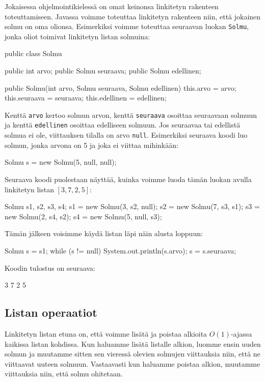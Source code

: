 Jokaisessa ohjelmointikielessä on omat keinonsa
linkitetyn rakenteen toteuttamiseen.
Javassa voimme toteuttaa linkitetyn rakenteen niin,
että jokainen solmu on oma olionsa.
Esimerkiksi voimme toteuttaa seuraavan luokan \texttt{Solmu},
jonka oliot toimivat linkitetyn listan solmuina:

\begin{code}
public class Solmu {
    public int arvo;
    public Solmu seuraava;
    public Solmu edellinen;

    public Solmu(int arvo, Solmu seuraava, Solmu edellinen) {
        this.arvo = arvo;
        this.seuraava = seuraava;
        this.edellinen = edellinen;
    }
}
\end{code}

Kenttä \texttt{arvo} kertoo solmun arvon,
kenttä \texttt{seuraava} osoittaa seuraavaan solmuun
ja kenttä \texttt{edellinen} osoittaa edelliseen solmuun.
Jos seuraavaa tai edellistä solmua ei ole,
viittauksen tilalla on arvo \texttt{null}.
Esimerkiksi seuraava koodi luo solmun,
jonka arvona on 5 ja joka ei viittaa mihinkään:

\begin{code}
Solmu s = new Solmu(5, null, null);
\end{code}

Seuraava koodi puolestaan näyttää, kuinka voimme luoda
tämän luokan avulla linkitetyn listan $[3,7,2,5]$:

\begin{code}
Solmu s1, s2, s3, s4;
s1 = new Solmu(3, s2, null);
s2 = new Solmu(7, s3, s1);
s3 = new Solmu(2, s4, s2);
s4 = new Solmu(5, null, s3);
\end{code}

Tämän jälkeen voisimme käydä listan läpi näin alusta loppuun:

\begin{code}
Solmu s = s1;
while (s != null) {
    System.out.println(s.arvo);
    s = s.seuraava;
}
\end{code}

Koodin tulostus on seuraava:

\begin{code}
3
7
2
5
\end{code}

\subsection{Listan operaatiot}

Linkitetyn listan etuna on,
että voimme lisätä ja poistaa
alkioita $O(1)$-ajassa kaikissa listan kohdissa.
Kun haluamme lisätä listalle alkion,
luomme ensin uuden solmun ja muutamme sitten
sen vieressä olevien solmujen viittauksia niin,
että ne viittaavat uuteen solmuun.
Vastaavasti kun haluamme poistaa alkion,
muutamme viittauksia niin, että solmu ohitetaan.

